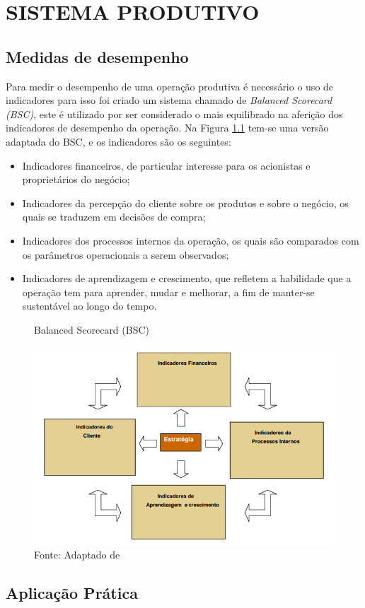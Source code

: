 \chapter{SISTEMA PRODUTIVO}
\label{chap:sistemas_produtivos}

\section{Medidas de desempenho} 
\label{sec:sistemas_produtivos_desempenho} 
Para medir o desempenho de uma operação produtiva é necessário o uso de indicadores para isso foi criado um sistema chamado de \textit{Balanced Scorecard (BSC)}, este é utilizado por ser considerado o mais equilibrado na aferição dos indicadores de desempenho da operação.
Na Figura \ref{fig:balanced_scorecard} tem-se uma versão adaptada do BSC, e os indicadores são os seguintes:

\begin{itemize}
    \item Indicadores financeiros, de particular interesse para os acionistas e proprietários do negócio;
    \item Indicadores da percepção do cliente sobre os produtos e sobre o negócio, os quais se traduzem em decisões de compra;
    \item Indicadores dos processos internos da operação, os quais são comparados com os parâmetros operacionais a serem observados;
    \item Indicadores de aprendizagem e crescimento, que refletem a habilidade que a operação tem para aprender, mudar e melhorar, a fim de manter-se sustentável ao longo do tempo.  
\end{itemize}


\begin{figure}[H]
    \caption{Balanced Scorecard (BSC)}
    \includegraphics[width =\textwidth]{images/bsc.png}
    \caption*{Fonte: Adaptado de \cite{kaplan1996using}}
    \label{fig:balanced_scorecard}
\end{figure}
  

\section{Aplicação Prática} 
\label{sec:estrategia_da_producao_aplicacao}





